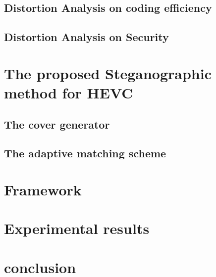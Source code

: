 \documentclass[journal,sort]{IEEEtran}
\begin{document}
\subsection{Distortion Analysis on coding efficiency}
\subsection{Distortion Analysis on Security}
\section{The proposed Steganographic method for HEVC}

\subsection{The cover generator}

\subsection{The adaptive matching scheme}
\section{Framework}



\section{Experimental results}
\section{conclusion}




	
	
	
	
	
	
	
\end{document}

